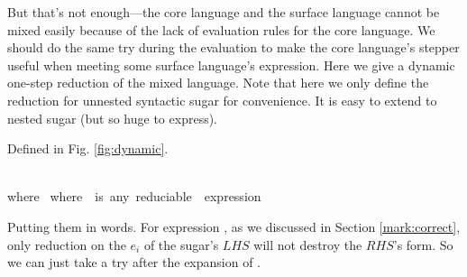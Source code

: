 But that's not enough---the core language and the surface language cannot be mixed easily because of the lack of evaluation rules for the core language. We should do the same try during the evaluation to make the core language's stepper useful when meeting some surface language's expression. Here we give a dynamic one-step reduction of the mixed language. Note that here we only define the reduction for unnested syntactic sugar for convenience. It is easy to extend to nested sugar (but so huge to express).

\begin{Def} Defined in Fig.  \ref{fig:dynamic}.
\end{Def}
\begin{figure*}[t]\footnotesize
{}
{}
{\\where~}
{}
{}
{}
\footnotesize{where~~is~any~reduciable~~expression}
\caption{Dynamic Reduction}
\label{fig:dynamic}
\end{figure*}

Putting them in words. For expression , as we discussed in Section \ref{mark:correct}, only reduction on the $e_i$ of the sugar's $LHS$ will not destroy the $RHS$'s form. So we can just take a try after the expansion of .

